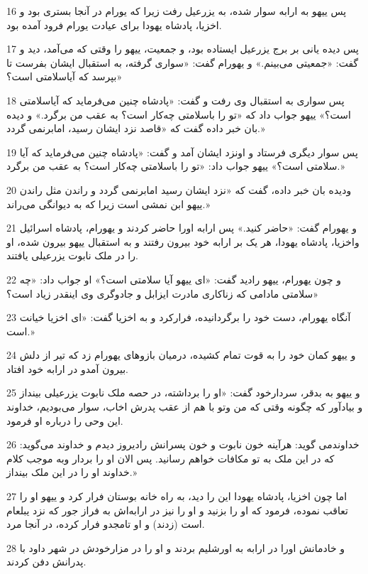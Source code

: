 \par 16 پس ییهو به ارابه سوار شده، به یزرعیل رفت زیرا که یورام در آنجا بستری بود و اخزیا، پادشاه یهودا برای عیادت یورام فرود آمده بود.
\par 17 پس دیده یانی بر برج یزرعیل ایستاده بود، و جمعیت، ییهو را وقتی که می‌آمد، دید و گفت: «جمعیتی می‌بینم.» و یهورام گفت: «سواری گرفته، به استقبال ایشان بفرست تا بپرسد که آیاسلامتی است؟»
\par 18 پس سواری به استقبال وی رفت و گفت: «پادشاه چنین می‌فرماید که آیاسلامتی است؟» ییهو جواب داد که «تو را باسلامتی چه‌کار است؟ به عقب من برگرد.» و دیده بان خبر داده گفت که «قاصد نزد ایشان رسید، امابرنمی گردد.»
\par 19 پس سوار دیگری فرستاد و اونزد ایشان آمد و گفت: «پادشاه چنین می‌فرماید که آیا سلامتی است؟» ییهو جواب داد: «تو را باسلامتی چه‌کار است؟ به عقب من برگرد.»
\par 20 ودیده بان خبر داده، گفت که «نزد ایشان رسید امابرنمی گردد و راندن مثل راندن ییهو ابن نمشی است زیرا که به دیوانگی می‌راند.»
\par 21 و یهورام گفت: «حاضر کنید.» پس ارابه اورا حاضر کردند و یهورام، پادشاه اسرائیل واخزیا، پادشاه یهودا، هر یک بر ارابه خود بیرون رفتند و به استقبال ییهو بیرون شده، او را در ملک نابوت یزرعیلی یافتند.
\par 22 و چون یهورام، ییهو رادید گفت: «ای ییهو آیا سلامتی است؟» او جواب داد: «چه سلامتی مادامی که زناکاری مادرت ایزابل و جادوگری وی اینقدر زیاد است؟»
\par 23 آنگاه یهورام، دست خود را برگردانیده، فرارکرد و به اخزیا گفت: «ای اخزیا خیانت است.»
\par 24 و ییهو کمان خود را به قوت تمام کشیده، درمیان بازوهای یهورام زد که تیر از دلش بیرون آمدو در ارابه خود افتاد.
\par 25 و ییهو به بدقر، سردارخود گفت: «او را برداشته، در حصه ملک نابوت یزرعیلی بینداز و بیادآور که چگونه وقتی که من وتو با هم از عقب پدرش اخاب، سوار می‌بودیم، خداوند این وحی را درباره او فرمود.
\par 26 خداوندمی گوید: هرآینه خون نابوت و خون پسرانش رادیروز دیدم و خداوند می‌گوید: که در این ملک به تو مکافات خواهم رسانید. پس الان او را بردار وبه موجب کلام خداوند او را در این ملک بینداز.»
\par 27 اما چون اخزیا، پادشاه یهودا این را دید، به راه خانه بوستان فرار کرد و ییهو او را تعاقب نموده، فرمود که او را بزنید و او را نیز در ارابه‌اش به فراز جور که نزد یبلعام است (زدند) و او تامجدو فرار کرده، در آنجا مرد.
\par 28 و خادمانش اورا در ارابه به اورشلیم بردند و او را در مزارخودش در شهر داود با پدرانش دفن کردند.
